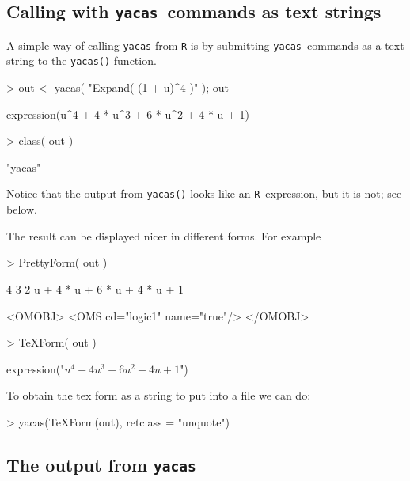 \documentclass[10pt]{article}
\newcommand{\yacas}{{\tt yacas}}
\newcommand{\code}[1]{{\tt #1}}
\def\R{\texttt{R}}
\begin{document}
\subsection{Calling with \yacas\ commands as text strings}
\label{sec:calling-with-yacas}

A simple way of calling \yacas{} from \R{} is by submitting \yacas\
commands as a text string to the \code{yacas()} function.
\begin{Schunk}
\begin{Sinput}
> out <- yacas( "Expand( (1 + u)^4 )" ); out
\end{Sinput}
\begin{Soutput}
expression(u^4 + 4 * u^3 + 6 * u^2 + 4 * u + 1)
\end{Soutput}
\begin{Sinput}
> class( out )
\end{Sinput}
\begin{Soutput}
[1] "yacas"
\end{Soutput}
\end{Schunk}

Notice that the output from \code{yacas()} looks like an \R\
expression, but it is not; see below.

The result can be displayed nicer in different forms. For example
\begin{Schunk}
\begin{Sinput}
> PrettyForm( out )
\end{Sinput}
\begin{Soutput}
 4        3        2            
u  + 4 * u  + 6 * u  + 4 * u + 1

<OMOBJ>
  <OMS cd="logic1" name="true"/>
</OMOBJ>
\end{Soutput}
\begin{Sinput}
> TeXForm( out )
\end{Sinput}
\begin{Soutput}
expression("$u ^{4} + 4 u ^{3} + 6 u ^{2} + 4 u + 1$")
\end{Soutput}
\end{Schunk}

To obtain the tex form as a string to put into a file we can do:
\begin{Schunk}
\begin{Sinput}
> yacas(TeXForm(out), retclass = "unquote")
\end{Sinput}
\end{Schunk}

\subsection{The output from \yacas}
\label{sec:output-from-yacas}
\end{document}
